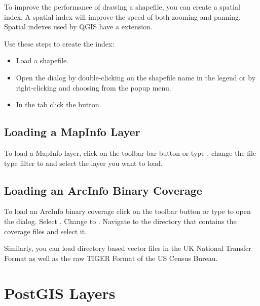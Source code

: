To improve the performance of drawing a shapefile, you can create a spatial
index. A  spatial index will improve the 
speed of both zooming and panning. Spatial indexes used by QGIS have a 
 extension.

Use these steps to create the index:

\begin{itemize}
\item Load a shapefile.
\item Open the  dialog by double-clicking on the
shapefile name in the legend or by right-clicking and choosing
 from the popup menu.
\item In the tab  click the  button.
\end{itemize}

\subsection{Loading a MapInfo Layer}

To load a MapInfo layer, click on the  toolbar bar button or type , change the
file type filter to  and select the layer you want to load.

\subsection{Loading an ArcInfo Binary Coverage}

To load an ArcInfo binary coverage click on the
 toolbar button or type
 to open the  dialog. Select
. Change to . 
Navigate to the directory that contains the coverage files and select it.

Similarly, you can load directory based  vector files in the UK National Transfer Format as well as the 
raw TIGER Format of the US Census Bureau.

\section{PostGIS Layers}
\label{label_postgis} 

